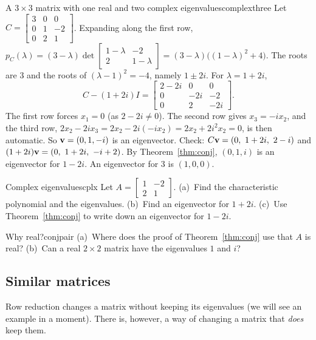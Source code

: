 \documentclass[11pt]{article}
\begin{document}
\begin{exmp}{A $3\times3$ matrix with one real and two complex eigenvalues}{complexthree}
Let $C=\begin{bmatrix}3&0&0\\0&1&-2\\0&2&1\end{bmatrix}$. Expanding along the first row, $p_C(\lambda)=(3-\lambda)\det\begin{bmatrix}1-\lambda&-2\\2&1-\lambda\end{bmatrix}=(3-\lambda)\bigl((1-\lambda)^2+4\bigr)$. The roots are $3$ and the roots of $(\lambda-1)^2=-4$, namely $1\pm2i$. For $\lambda=1+2i$,
\[
C-(1+2i)I=\begin{bmatrix}2-2i&0&0\\0&-2i&-2\\0&2&-2i\end{bmatrix}.
\]
The first row forces $x_1=0$ (as $2-2i\neq0$). The second row gives $x_3=-ix_2$, and the third row, $2x_2-2ix_3=2x_2-2i(-ix_2)=2x_2+2i^2x_2=0$, is then automatic. So $\mathbf{v}=(0,1,-i)$ is an eigenvector. Check: $C\bv{v}=(0,\ 1+2i,\ 2-i)$ and $(1+2i)\bv{v}=(0,\ 1+2i,\ -i+2)$. By Theorem~\ref{thm:conj}, $(0,1,i)$ is an eigenvector for $1-2i$. An eigenvector for $3$ is $(1,0,0)$.
\end{exmp}

\begin{kc}{Complex eigenvalues}{cplx}
Let $A=\begin{bmatrix}1&-2\\2&1\end{bmatrix}$. (a)~Find the characteristic polynomial and the eigenvalues. (b)~Find an eigenvector for $1+2i$. (c)~Use Theorem~\ref{thm:conj} to write down an eigenvector for $1-2i$.
\end{kc}

\begin{think}{Why real?}{conjpair}
(a)~Where does the proof of Theorem~\ref{thm:conj} use that $A$ is real? (b)~Can a real $2\times2$ matrix have the eigenvalues $1$ and $i$?
\end{think}

\subsection*{Similar matrices}

Row reduction changes a matrix without keeping its eigenvalues (we will see an example in a moment). There is, however, a way of changing a matrix that \emph{does} keep them.
\end{document}
